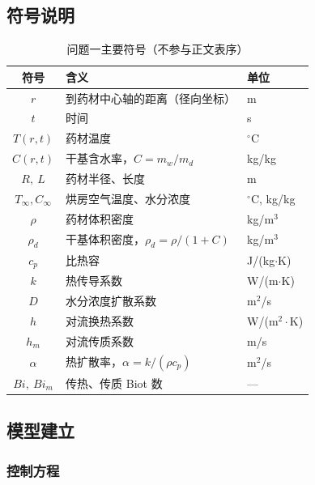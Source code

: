 \documentclass[12pt,a4paper]{ctexart}
\begin{document}
\subsection{符号说明}

\begin{table}[htbp]
  \centering
  \caption*{问题一主要符号（不参与正文表序）}
  \label{tab:p1-symbols}
  \small
  \begin{tabular}{cll}
    \toprule
    符号 & 含义 & 单位 \\
    \midrule
    $r$            & 到药材中心轴的距离（径向坐标）   & m \\
    $t$            & 时间                            & s \\
    $T(r,t)$       & 药材温度                        & $^\circ$C \\
    $C(r,t)$       & 干基含水率，$C=m_w/m_d$          & kg/kg \\
    $R,\ L$        & 药材半径、长度                   & m \\
    $T_\infty,C_\infty$ & 烘房空气温度、水分浓度        & $^\circ$C, kg/kg \\
    $\rho$         & 药材体积密度                    & kg/m$^3$ \\
    $\rho_d$       & 干基体积密度，$\rho_d=\rho/(1+C)$ & kg/m$^3$ \\
    $c_p$          & 比热容                          & J/(kg$\cdot$K) \\
    $k$            & 热传导系数                       & W/(m$\cdot$K) \\
    $D$            & 水分浓度扩散系数                 & m$^2$/s \\
    $h$            & 对流换热系数                     & W/(m$^2\cdot$K) \\
    $h_m$          & 对流传质系数                     & m/s \\
    $\alpha$       & 热扩散率，$\alpha=k/(\rho c_p)$  & m$^2$/s \\
    $Bi,\ Bi_m$    & 传热、传质 Biot 数               & --- \\
    \bottomrule
  \end{tabular}
\end{table}

\subsection{模型建立}

\subsubsection{控制方程}
\end{document}
